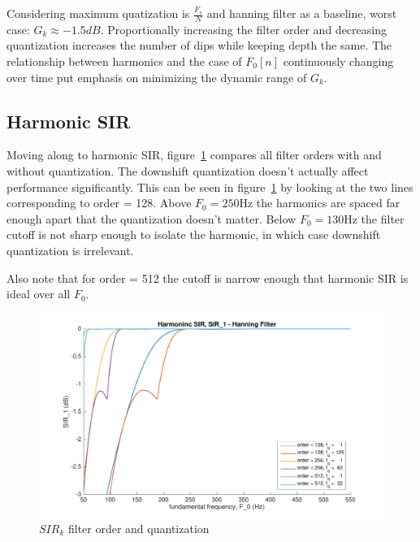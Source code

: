 \documentclass [11pt, proquest,oneside] {ganter_thesis}[2015/03/03]
\begin{document}
Considering maximum quatization is $\frac{F_s}{N}$ and hanning filter as a baseline, worst case: $G_k \approx -1.5dB$.  Proportionally increasing the filter order and decreasing quantization increases the number of dips while keeping depth the same.  The relationship between harmonics and the case of $F_0[n]$ continuously changing over time put emphasis on minimizing the dynamic range of $G_k$.





\clearpage

\subsection{Harmonic SIR}

Moving along to harmonic SIR, figure~\ref{fig:sir_k_1} compares all filter orders with and without quantization.  The downshift quantization doesn't actually affect performance significantly.  This can be seen in figure~\ref{fig:sir_k_1} by looking at the two lines corresponding to order = 128.  Above $F_0 = 250$Hz the harmonics are spaced far enough apart that the quantization doesn't matter.  Below $F_0 = 130$Hz the filter cutoff is not sharp enough to isolate the harmonic, in which case downshift quantization is irrelevant.

Also note that for order = 512 the cutoff is narrow enough that harmonic SIR is  ideal over all $F_0$.

\begin{figure}[!ht]
  \centering
    \includegraphics[width=1\textwidth]{sir_k_1}   
    \caption{$SIR_k$ filter order and quantization}\label{fig:sir_k_1}
\end{figure}
\end{document}

